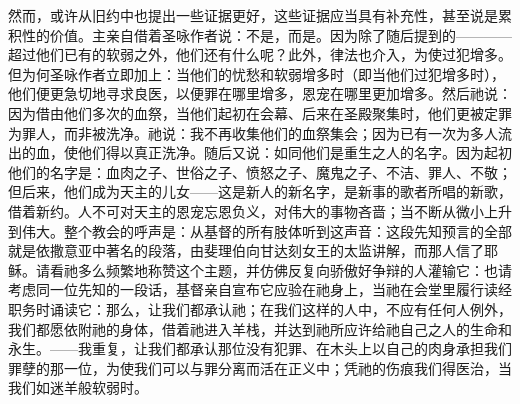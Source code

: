 然而，或许从旧约中也提出一些证据更好，这些证据应当具有补充性，甚至说是累积性的价值。主亲自借着圣咏作者说：不是，而是。因为除了随后提到的————超过他们已有的软弱之外，他们还有什么呢？此外，律法也介入，为使过犯增多。但为何圣咏作者立即加上：当他们的忧愁和软弱增多时（即当他们过犯增多时），他们便更急切地寻求良医，以便罪在哪里增多，恩宠在哪里更加增多。然后祂说：因为借由他们多次的血祭，当他们起初在会幕、后来在圣殿聚集时，他们更被定罪为罪人，而非被洗净。祂说：我不再收集他们的血祭集会；因为已有一次为多人流出的血，使他们得以真正洗净。随后又说：如同他们是重生之人的名字。因为起初他们的名字是：血肉之子、世俗之子、愤怒之子、魔鬼之子、不洁、罪人、不敬；但后来，他们成为天主的儿女——这是新人的新名字，是新事的歌者所唱的新歌，借着新约。人不可对天主的恩宠忘恩负义，对伟大的事物吝啬；当不断从微小上升到伟大。整个教会的呼声是：从基督的所有肢体听到这声音：这段先知预言的全部就是依撒意亚中著名的段落，由斐理伯向甘达刻女王的太监讲解，而那人信了耶稣。请看祂多么频繁地称赞这个主题，并仿佛反复向骄傲好争辩的人灌输它：也请考虑同一位先知的一段话，基督亲自宣布它应验在祂身上，当祂在会堂里履行读经职务时诵读它：那么，让我们都承认祂；在我们这样的人中，不应有任何人例外，我们都愿依附祂的身体，借着祂进入羊栈，并达到祂所应许给祂自己之人的生命和永生。——我重复，让我们都承认那位没有犯罪、在木头上以自己的肉身承担我们罪孽的那一位，为使我们可以与罪分离而活在正义中；凭祂的伤痕我们得医治，当我们如迷羊般软弱时。\par

